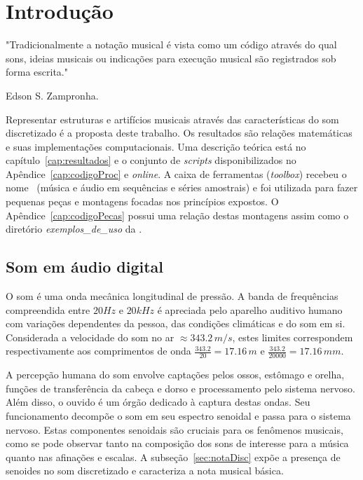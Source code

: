 \chapter{Introdução} %
\setcounter{page}{29}
\label{cap:intro} 
\epigraph{"Tradicionalmente a notação musical é vista como um código através do qual sons, ideias musicais ou indicações para execução musical são registrados sob forma escrita."}{Edson S. Zampronha.\cite{Zampronha} \\}


Representar estruturas e artifícios musicais através das características do som discretizado
é a proposta deste trabalho. Os resultados são relações matemáticas e suas implementações computacionais. Uma descrição teórica está no capítulo~\ref{cap:resultados} e o conjunto de \emph{scripts} disponibilizados no Apêndice~\ref{cap:codigoProc} e \emph{online}. A caixa de ferramentas (\emph{toolbox}) recebeu o nome \massa\ (música e áudio em sequências e séries amostrais) e foi utilizada para fazer pequenas peças e montagens focadas nos princípios expostos. O Apêndice~\ref{cap:codigoPecas} possui uma relação destas montagens assim como o diretório \emph{exemplos\_de\_uso} da \massa.\cite{MASSA}

    \section{Som em áudio digital}\label{sec:audio}

O som é uma onda mecânica longitudinal de pressão. A banda de frequências compreendida entre $20Hz$ e $20 kHz$ é apreciada pelo aparelho auditivo humano com variações dependentes da pessoa, das condições climáticas e do som em si.
 Considerada a velocidade do som no ar $\approx 343.2\,m/s$,
estes limites correspondem respectivamente aos comprimentos de onda $\frac{343.2}{20} = 17.16\,m$ e $\frac{343.2}{20000}=17.16\,mm$.\cite{Roederer}


A percepção humana do som envolve captações pelos ossos, estômago e orelha, funções de transferência da cabeça e dorso e processamento pelo sistema nervoso. Além disso, o ouvido é um órgão dedicado à captura destas ondas. Seu funcionamento decompõe o som em seu espectro senoidal e passa para o sistema nervoso.\cite{Roederer} Estas componentes senoidais são cruciais para os fenômenos musicais, como se pode observar tanto na composição dos sons de interesse para a música quanto nas afinações e escalas.\cite{floEsp} A subseção~\ref{sec:notaDisc} expõe a presença de senoides no som discretizado e caracteriza a nota musical básica.

